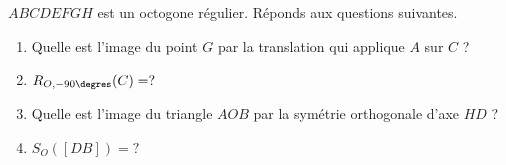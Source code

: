 %
%
    $ABCDEFGH$ est un octogone régulier. Réponds aux questions suivantes.
    \begin{center}
        
    \end{center}
    \begin{enumerate}
        \item Quelle est l'image du point $G$ par la translation qui applique $A$ sur $C$ ? 
        \item $R_{O,-90\degres}(C)=?$ 
        \item Quelle est l'image du triangle $AOB$ par la symétrie orthogonale d'axe $HD$ ? 
        \item $S_{O}([DB])=?$ \blank{$[HF]$}
    \end{enumerate}
